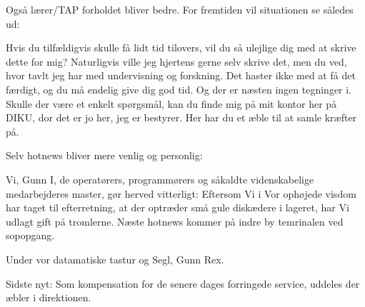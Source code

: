 \documentclass[a4paper,11pt]{article}
\begin{document}
\begin{sketch}

 Også lærer/TAP forholdet bliver bedre.  For fremtiden vil
situationen se således ud:

 Hvis du tilfældigvis skulle få lidt tid tilovers, vil du så
ulejlige dig med at skrive dette for mig?  Naturligvis ville jeg
hjertens gerne selv skrive det, men du ved, hvor tavlt jeg har med
undervisning og forskning.  Det haster ikke med at få det færdigt, og
du må endelig give dig god tid.  Og der er næsten ingen tegninger i.
Skulle der være et enkelt spørgsmål, kan du finde mig på mit kontor
her på DIKU, dor det er jo her, jeg er bestyrer.  Her har du et æble
til at samle kræfter på.


 Selv hotnews bliver mere venlig og personlig:


 Vi, Gunn I, de operatørers, programmørers og såkaldte
videnskabelige medarbejderes master, gør herved vitterligt: Eftersom
Vi i Vor ophøjede visdom har taget til efterretning, at der optræder
små gule diskædere i lageret, har Vi udlagt gift på tromlerne.  Næste hotnews kommer på indre by temrinalen ved sopopgang.

Under vor datamatiske tastur og Segl, Gunn Rex.

Sidste nyt: Som kompensation for de senere dages forringede service,
uddeles der æbler i direktionen.

\end{sketch}
\end{document}
